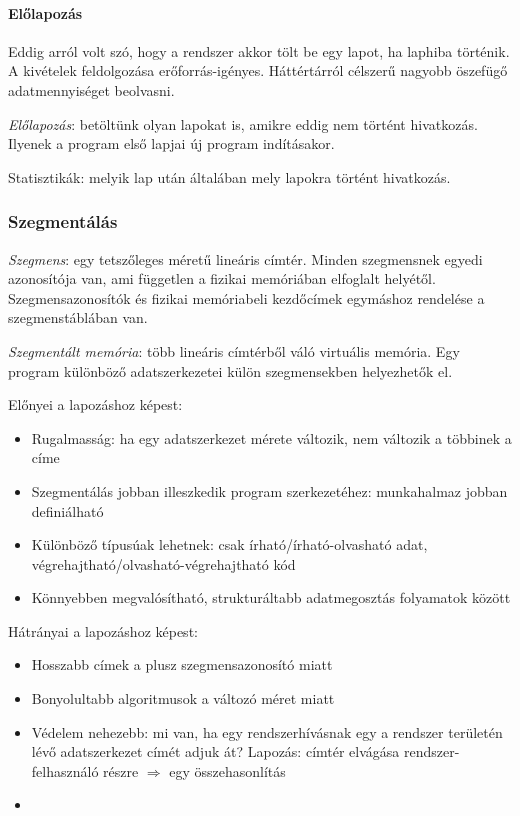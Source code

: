\documentclass[fleqn,10pt,a4paper]{article}
\newcommand{\nn}{\Rightarrow}
\theoremstyle{magyar}
\begin{document}
  \paragraph{Előlapozás} Eddig arról volt szó, hogy a rendszer akkor tölt be egy lapot, ha laphiba történik. A kivételek
  feldolgozása erőforrás-igényes. Háttértárról célszerű nagyobb öszefügő adatmennyiséget beolvasni.
  
  \emph{Előlapozás}: betöltünk olyan lapokat is, amikre eddig nem történt hivatkozás. Ilyenek a program első lapjai új
  program indításakor.
  
  Statisztikák: melyik lap után általában mely lapokra történt hivatkozás.

  \subsubsection{Szegmentálás}

  \emph{Szegmens}: egy tetszőleges méretű lineáris címtér. Minden szegmensnek egyedi azonosítója van, ami független a
  fizikai memóriában elfoglalt helyétől. Szegmensazonosítók és fizikai memóriabeli kezdőcímek egymáshoz rendelése a
  szegmenstáblában van.
  
  \emph{Szegmentált memória}: több lineáris címtérből váló virtuális memória. Egy program különböző adatszerkezetei
  külön szegmensekben helyezhetők el.  
  
  Előnyei a lapozáshoz képest:
  \begin{itemize}
  \item Rugalmasság: ha egy adatszerkezet mérete változik, nem változik a többinek a címe 
  \item Szegmentálás jobban illeszkedik program szerkezetéhez: munkahalmaz jobban definiálható 
  \item Különböző típusúak lehetnek: csak írható/írható-olvasható adat, végrehajtható/olvasható-végrehajtható kód 
  \item Könnyebben megvalósítható, strukturáltabb adatmegosztás folyamatok között
  \end{itemize}
  
  Hátrányai a lapozáshoz képest: 
  \begin{itemize}
  \item Hosszabb címek a plusz szegmensazonosító miatt 
  \item Bonyolultabb algoritmusok a változó méret miatt 
  \item Védelem nehezebb: mi van, ha egy rendszerhívásnak egy a rendszer területén lévő adatszerkezet címét adjuk át? 
    Lapozás: címtér elvágása rendszer-felhasználó részre $\nn$ egy összehasonlítás
  \item
  \end{itemize}
  
\end{document}
